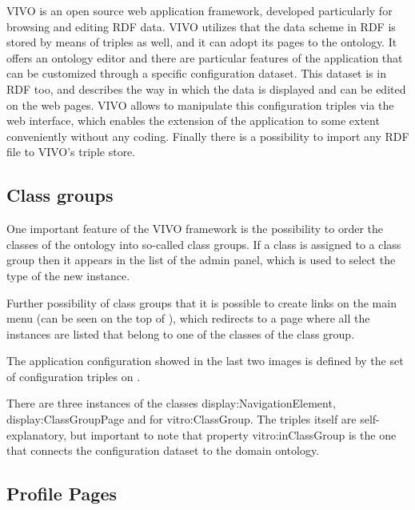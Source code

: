 VIVO is an open source web application framework, developed particularly for browsing and editing RDF data. VIVO utilizes that the data scheme in RDF is stored by means of triples as well, and it can adopt its pages to the ontology.  It offers an ontology editor and there are particular features of the application that can be customized through a specific configuration dataset.  This dataset is in RDF too, and describes the way in which the data is displayed and can be edited on the web pages. VIVO allows to manipulate this configuration triples via the web interface, which enables the extension of the application to some extent conveniently without any coding. Finally there is a possibility to import any RDF file to VIVO’s triple store.

\subsection{Class groups}

One important feature of the VIVO framework is the possibility to order the classes of the ontology into so-called class groups. If a class is assigned to a class group then it appears in the list of the admin panel, which is used to select the type of the new instance.


Further possibility of class groups that it is possible to create links on the main menu (can be seen on the top of ), which redirects to a page where all the instances are listed that belong to one of the classes of the class group.


The application configuration showed in the last two images is  defined by the set of configuration triples on .


There are three instances of the classes display:NavigationElement, display:ClassGroupPage and for vitro:ClassGroup. The triples itself are self-explanatory, but important to note that property vitro:inClassGroup is the one that connects the configuration dataset to the domain ontology.  

\subsection{Profile Pages}

